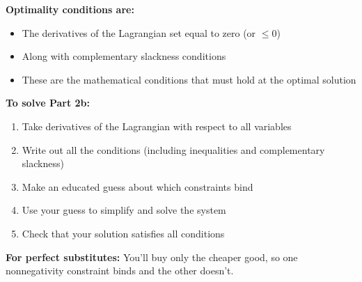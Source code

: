 \documentclass[11pt]{article}
\begin{document}
\begin{tcolorbox}[colback=blue!5!white,colframe=blue!75!black,title=Understanding Part 2b]
\textbf{Optimality conditions are:}
\begin{itemize}
\item The derivatives of the Lagrangian set equal to zero (or $\leq 0$)
\item Along with complementary slackness conditions
\item These are the mathematical conditions that must hold at the optimal solution
\end{itemize}

\textbf{To solve Part 2b:}
\begin{enumerate}
\item Take derivatives of the Lagrangian with respect to all variables
\item Write out all the conditions (including inequalities and complementary slackness)
\item Make an educated guess about which constraints bind
\item Use your guess to simplify and solve the system
\item Check that your solution satisfies all conditions
\end{enumerate}

\textbf{For perfect substitutes:} You'll buy only the cheaper good, so one nonnegativity constraint binds and the other doesn't.
\end{tcolorbox}
\end{document}
